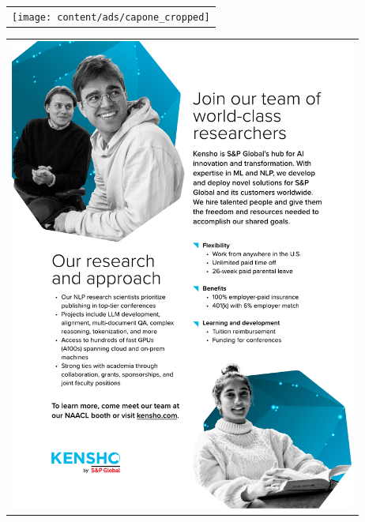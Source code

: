\thispagestyle{empty}
\begin{center}\begin{tabular}{c}
  \texttt{[image: content/ads/capone\_cropped]} \\
\end{tabular}\end{center}
\begin{center}\begin{tabular}{c}
  \includegraphics[width=4.5in]{content/ads/kensho} \\
\end{tabular}\end{center}
